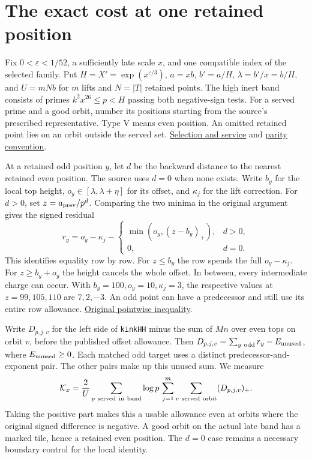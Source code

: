 \documentclass[12pt,letterpaper]{article}
\newcommand{\orig}[3]{\href{https://github.com/nousentllc/riemann-hypothesis/blob/40e56bab026552e089d7afcfeff08d2defb9c005/src/#1.lean\#L#2}{#3}}
\newcommand{\pagepart}[1]{\clearpage\section{#1}}
\begin{document}
\pagepart{The exact cost at one retained position}
Fix \(0<\varepsilon<1/52\), a sufficiently late scale \(x\), and one compatible index of the selected family. Put \(H=X'=\exp(x^{\varepsilon/3})\), \(a=xb\), \(b'=a/H\), \(\lambda=b'/x=b/H\), and \(U=mNb\) for \(m\) lifts and \(N=|T|\) retained points. The high inert band consists of primes \(k^2x^{26}\le p<H\) passing both negative-sign tests. For a served prime and a good orbit, number its positions starting from the source's prescribed representative. Type V means even position. An omitted retained point lies on an orbit outside the served set.
\orig{Formalism/LocalToGlobal/GlobalTheory/IsResidueClassZero}{195}{Selection and service} and \orig{Formalism/SharpRestriction/GrowthBounds/UnramifiedQuadraticSetting}{54}{parity convention}.

At a retained odd position \(y\), let \(d\) be the backward distance to the nearest retained even position. The source uses \(d=0\) when none exists. Write \(b_y\) for the local top height, \(o_y\in[\lambda,\lambda+\eta]\) for its offset, and \(\kappa_j\) for the lift correction. For \(d>0\), set \(z=a_{\rm prev}/p^d\). Comparing the two minima in the original argument gives the signed residual
\[
 r_y=o_y-\kappa_j-
 \begin{cases}
   \min(o_y,(z-b_y)_+),&d>0,\\
   0,&d=0 .
 \end{cases}
\]
This identifies equality row by row. For \(z\le b_y\) the row spends the full \(o_y-\kappa_j\). For \(z\ge b_y+o_y\) the height cancels the whole offset. In between, every intermediate charge can occur. With \(b_y=100,o_y=10,\kappa_j=3\), the respective values at \(z=99,105,110\) are \(7,2,-3\). An odd point can have a predecessor and still use its entire row allowance. \orig{Formalism/SharpRestriction/GrowthBounds/LogarithmicSums/PartnerCountOfCentral}{399}{Original pointwise inequality}.

Write \(D_{p,j,v}\) for the left side of \texttt{kinkHH} minus the sum of \(Mn\) over even tops on orbit \(v\), before the published offset allowance. Then \(D_{p,j,v}=\sum_{y\ {\rm odd}} r_y-E_{\rm unused}\), where \(E_{\rm unused}\ge0\). Each matched odd target uses a distinct predecessor-and-exponent pair. The other pairs make up this unused sum. We measure
\[
 \mathcal K_x=\frac{2}{U}\sum_{p\ {\rm served\ in\ band}}\log p\,
            \sum_{j=1}^m\sum_{v\ {\rm served\ orbit}}(D_{p,j,v})_+ .
\]
Taking the positive part makes this a usable allowance even at orbits where the original signed difference is negative. A good orbit on the actual late band has a marked tile, hence a retained even position. The \(d=0\) case remains a necessary boundary control for the local identity.
\end{document}
